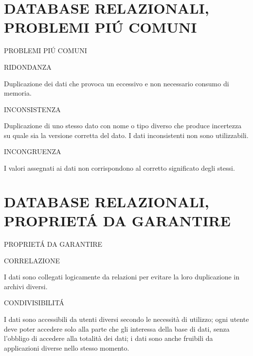 \documentclass[aspectratio=1610]{beamer}
\begin{document}
\section{DATABASE RELAZIONALI, PROBLEMI PI\'U COMUNI}

\begin{frame}{PROBLEMI PI\'U COMUNI}
    \begin{alertblock}{RIDONDANZA}
        \begin{minipage}{0.98\linewidth}
            \justifying
            Duplicazione dei dati che provoca un eccessivo e non necessario consumo di memoria.
        \end{minipage}
    \end{alertblock}
    \pause
    \begin{alertblock}{INCONSISTENZA}
        \begin{minipage}{0.98\linewidth}
            \justifying
            Duplicazione di uno stesso dato con nome o tipo diverso che produce 
            incertezza su quale sia la versione corretta del dato. I dati inconsistenti non 
            sono utilizzabili.
        \end{minipage}
    \end{alertblock}
    \pause
    \begin{alertblock}{INCONGRUENZA}
        \begin{minipage}{0.98\linewidth}
            \justifying
            I valori assegnati ai dati non corrispondono al corretto significato degli stessi.
        \end{minipage}
    \end{alertblock}
\end{frame}

\section{DATABASE RELAZIONALI, PROPRIET\'A DA GARANTIRE}

\begin{frame}{PROPRIET\'A DA GARANTIRE}
    \begin{alertblock}{CORRELAZIONE}
        \begin{minipage}{0.98\linewidth}
            \justifying
            I dati sono collegati logicamente da relazioni per evitare la loro duplicazione 
            in archivi diversi.
        \end{minipage}
    \end{alertblock}
    \pause
    \begin{alertblock}{CONDIVISIBILIT\'A}
        \begin{minipage}{0.98\linewidth}
            \justifying
            I dati sono accessibili da utenti diversi secondo le necessità di utilizzo; ogni 
            utente deve poter accedere solo alla parte che gli interessa della base di 
            dati, senza l’obbligo di accedere alla totalità dei dati; i dati sono anche fruibili 
            da applicazioni diverse nello stesso momento.
        \end{minipage}
    \end{alertblock}
\end{frame}
\end{document}
